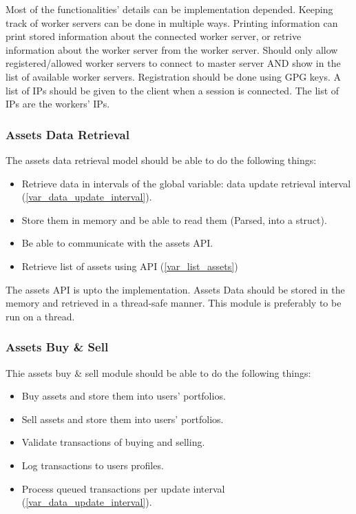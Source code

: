 \documentclass[a4paper]{article}
\begin{document}
Most of the functionalities' details can be implementation depended. Keeping
track of worker servers can be done in multiple ways. Printing information can
print stored information about the connected worker server, or retrive 
information about the worker server from the worker server. Should only allow
registered/allowed worker servers to connect to master server AND show in the 
list of available worker servers. Registration should be done using GPG keys.
A list of IPs should be given to the client when a session is connected. The 
list of IPs are the workers' IPs.

\subsubsection{Assets Data Retrieval}
The assets data retrieval model should be able to do the following things:
\begin{itemize}
	\item Retrieve data in intervals of the global variable: data update 
		retrieval interval (\ref{var_data_update_interval}).
	\item Store them in memory and be able to read them (Parsed, into a 
		struct).
	\item Be able to communicate with the assets API.
	\item Retrieve list of assets using API (\ref{var_list_assets})
\end{itemize}

The assets API is upto the implementation. Assets Data should be stored in the
memory and retrieved in a thread-safe manner. This module is preferably to be 
run on a thread.

\subsubsection{Assets Buy \& Sell}
Thie assets buy \& sell module should be able to do the following things:
\begin{itemize}
	\item Buy assets and store them into users' portfolios.
	\item Sell assets and store them into users' portfolios.
	\item Validate transactions of buying and selling.
	\item Log transactions to users profiles.
	\item Process queued transactions per update interval 
		(\ref{var_data_update_interval}).
\end{itemize}
\end{document}
